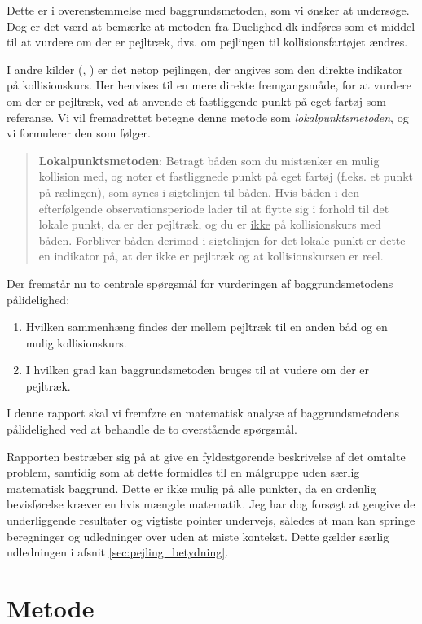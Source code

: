 \documentclass[%
 reprint,
nofootinbib,
aps,
]{revtex4-1}
\begin{document}
Dette er i overenstemmelse med baggrundsmetoden, som vi ønsker at undersøge. Dog er det værd at bemærke at metoden fra Duelighed.dk indføres som et middel til at vurdere om der er pejltræk, dvs. om pejlingen til kollisionsfartøjet ændres. \par
I andre kilder (\cite{studienoter}, \cite{retsinformation} \cite{groensund}) er det netop pejlingen, der angives som den direkte indikator på kollisionskurs. Her henvises til en mere direkte fremgangsmåde, for at vurdere om der er pejltræk, ved at anvende et fastliggende punkt på eget fartøj som referanse. Vi vil fremadrettet betegne denne metode som \textit{lokalpunktsmetoden}, og vi formulerer den som følger.
\begin{quote}
\textbf{Lokalpunktsmetoden}: Betragt båden som du mistænker en mulig kollision med, og noter et fastliggnede punkt på eget fartøj (f.eks. et punkt på rælingen), som synes i sigtelinjen til båden. Hvis båden i den efterfølgende observationsperiode lader til at flytte sig i forhold til det lokale punkt, da er der pejltræk, og du er \underline{ikke} på kollisionskurs med båden. Forbliver båden derimod i sigtelinjen for det lokale punkt er dette en indikator på, at der ikke er pejltræk og at kollisionskursen er reel.
\end{quote}
Der fremstår nu to centrale spørgsmål for vurderingen af baggrundsmetodens pålidelighed:
\begin{enumerate}
  \item Hvilken sammenhæng findes der mellem pejltræk til en anden båd og en mulig kollisionskurs.
  \item I hvilken grad kan baggrundsmetoden bruges til at vudere om der er pejltræk.
\end{enumerate}
I denne rapport skal vi fremføre en matematisk analyse af baggrundsmetodens pålidelighed ved at behandle de to overstående spørgsmål. \par
Rapporten bestræber sig på at give en fyldestgørende beskrivelse af det omtalte problem, samtidig som at dette formidles til en målgruppe uden særlig matematisk baggrund. Dette er ikke mulig på alle punkter, da en ordenlig bevisførelse kræver en hvis mængde matematik. Jeg har dog forsøgt at gengive de underliggende resultater og vigtiste pointer undervejs, således at man kan springe beregninger og udledninger over uden at miste kontekst. Dette gælder særlig udledningen i afsnit \ref{sec:pejling_betydning}.


\section{Metode}
\end{document}
